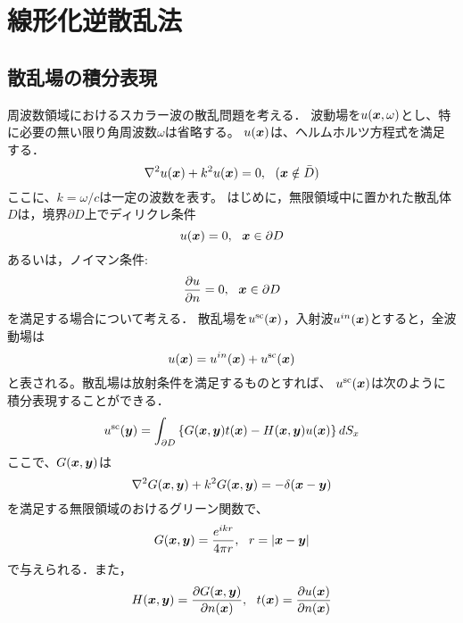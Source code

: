 \documentclass[10pt,a4j,dvipdfmx]{jarticle}
\begin{document}
\section{線形化逆散乱法}
\subsection{散乱場の積分表現}
周波数領域におけるスカラー波の散乱問題を考える．
波動場を$u(\mbox{\boldmath $x$},\omega)$とし、特に必要の無い限り角周波数$\omega$は省略する。
$u(\mbox{\boldmath $x$})$は、ヘルムホルツ方程式を満足する．
\begin{equation}
	\nabla^2 u(\fat{x}) + k^2 u(\fat{x}) =0, \ \ (\fat{x} \notin \bar{D})
	\label{eqn:}
\end{equation}
ここに、$k=\omega/c$は一定の波数を表す。
はじめに，無限領域中に置かれた散乱体$D$は，境界$\partial D$上でディリクレ条件
\begin{equation}
	u(\mbox{\boldmath $x$}) = 0, \ \ \mbox{\boldmath $x$}\in \partial D
	\label{eqn:}
\end{equation}
あるいは，ノイマン条件:
\begin{equation}
	\frac{\partial u}{\partial n} = 0 ,\ \ \mbox{\boldmath $x$}\in \partial D
	\label{eqn:}
\end{equation}
を満足する場合について考える．
散乱場を$u^{\rm sc}(\mbox{\boldmath $x$})$，入射波$u^{in}(\mbox{\boldmath $x$})$とすると，全波動場は
\begin{equation}
	u(\mbox{\boldmath $x$})=u^{in}(\mbox{\boldmath $x$})+ u^{\rm sc}(\mbox{\boldmath $x$})
	\label{eqn:}
\end{equation}
と表される。散乱場は放射条件を満足するものとすれば、
$u^{\rm sc}(\mbox{\boldmath $x$})$は次のように積分表現することができる．
\begin{equation}
	u^{\rm sc}(\mbox{\boldmath $y$}) = \int _{\partial D} 
	\left\{
		G(\mbox{\boldmath $x$},\mbox{\boldmath $y$})t(\mbox{\boldmath $x$})
	-
		H(\mbox{\boldmath $x$},\mbox{\boldmath $y$})u(\mbox{\boldmath $x$})
	\right\} dS_x
	\label{eqn:}
\end{equation}
ここで、$G(\mbox{\boldmath $x$},\mbox{\boldmath $y$})$は
\begin{equation}
	\nabla^2 G(\mbox{\boldmath $x$},\mbox{\boldmath $y$}) + k^2 G(\mbox{\boldmath $x$},\mbox{\boldmath $y$}) =-\delta (\mbox{\boldmath $x$}-\mbox{\boldmath $y$} )
	\label{eqn:}
\end{equation}
を満足する無限領域のおけるグリーン関数で、
\begin{equation}
	G(\mbox{\boldmath $x$},\mbox{\boldmath $y$}) =\frac{e^{ikr}}{4\pi r}, \ \ r=\left| \mbox{\boldmath $x$}-\mbox{\boldmath $y$} \right|
	\label{eqn:Green}
\end{equation}
で与えられる．また，
\begin{equation}
	H(\fat{x},\fat{y}) = \frac{\partial G(\fat{x},\fat{y})}{\partial n(\fat{x})}, \ \ 
	t(\fat{x}) =\frac{\partial u(\fat{x})}{\partial n(\fat{x})}
	\label{eqn:}
\end{equation}
\end{document}
